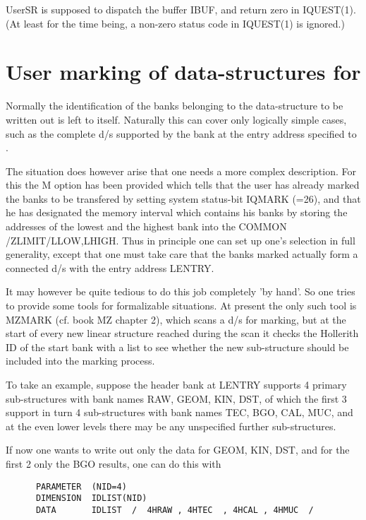 {UserSR is supposed to dispatch the buffer IBUF,
and return zero in IQUEST(1).
(At least for the time being, a non-zero status code in IQUEST(1)
is ignored.)

\section{User marking of data-structures for \protect{}}

Normally the identification of the banks belonging to the
data-structure to be written out is left to  itself.
Naturally this can cover only logically simple cases,
such as the complete d/s supported by the bank at the
entry address specified to .

The situation does however arise that one needs a more
complex description.
For this the M option has been provided which tells 
that the user has already marked the banks to be transfered
by setting system status-bit IQMARK (=26),
and that he has designated the memory interval which contains
his banks by storing the addresses of the lowest and the highest
bank into the COMMON /ZLIMIT/LLOW,LHIGH.
Thus in principle one can set up one's selection in full
generality,
except that one must take care that the banks marked
actually form a connected d/s with the entry address LENTRY.

It may however be quite tedious to do this job completely
'by hand'.
So one tries to provide some tools for formalizable situations.
At present the only such tool is MZMARK (cf. book MZ chapter 2),
which scans a d/s for marking,
but at the start of every new linear structure reached during
the scan it checks the Hollerith ID of the start bank
with a list to see whether the new sub-structure should
be included into the marking process.

To take an example, suppose the header bank at LENTRY
supports 4 primary sub-structures with bank names
RAW, GEOM, KIN, DST, of which the first 3 support in turn
4 sub-structures with bank names TEC, BGO, CAL, MUC,
and at the even lower levels there may be any unspecified further
sub-structures.

If now one wants to write out only the data for GEOM, KIN, DST,
and for the first 2 only the BGO results,
one can do this with

\begin{verbatim}
      PARAMETER  (NID=4)
      DIMENSION  IDLIST(NID)
      DATA       IDLIST  /  4HRAW , 4HTEC  , 4HCAL , 4HMUC  /


\end{verbatim}}
